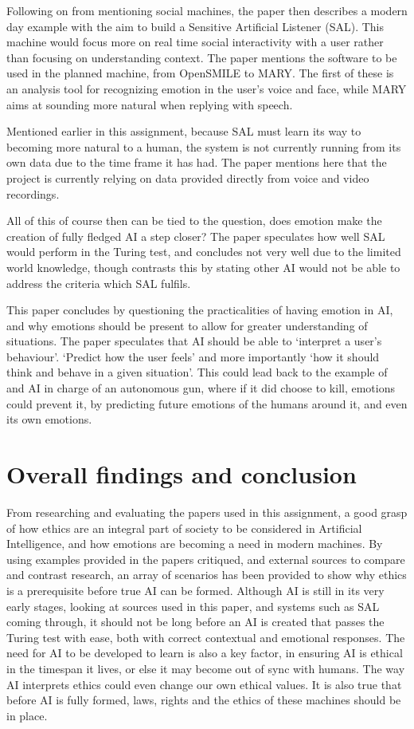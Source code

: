 \documentclass[article]{IEEEtran}
\begin{document}
Following on from mentioning social machines, the paper then describes a modern day example with the aim to build a Sensitive Artificial Listener (SAL). This machine would focus more on real time social interactivity with a user rather than focusing on understanding context. The paper mentions the software to be used in the planned machine, from OpenSMILE to MARY. The first of these is an analysis tool for recognizing emotion in the user’s voice and face, while MARY aims at sounding more natural when replying with speech. \par
Mentioned earlier in this assignment, because SAL must learn its way to becoming more natural to a human, the system is not currently running from its own data due to the time frame it has had. The paper mentions here that the project is currently relying on data provided directly from voice and video recordings. \par
All of this of course then can be tied to the question, does emotion make the creation of fully fledged AI a step closer? The paper speculates how well SAL would perform in the Turing test, and concludes not very well due to the limited world knowledge, though contrasts this by stating other AI would not be able to address the criteria which SAL fulfils.\par
This paper concludes by questioning the practicalities of having emotion in AI, and why emotions should be present to allow for greater understanding of situations. The paper speculates that AI should be able to ‘interpret a user’s behaviour’. ‘Predict how the user feels’ and more importantly ‘how it should think and behave in a given situation’. This could lead back to the example of and AI in charge of an autonomous gun, where if it did choose to kill, emotions could prevent it, by predicting future emotions of the humans around it, and even its own emotions. \par

\section{Overall findings and conclusion}
From researching and evaluating the papers used in this assignment, a good grasp of how ethics are an integral part of society to be considered in Artificial Intelligence, and how emotions are becoming a need in modern machines. By using examples provided in the papers critiqued, and external sources to compare and contrast research, an array of scenarios has been provided to show why ethics is a prerequisite before true AI can be formed.
 Although AI is still in its very early stages, looking at sources used in this paper, and systems such as SAL coming through, it should not be long before an AI is created that passes the Turing test with ease, both with correct contextual and emotional responses. The need for AI to be developed to learn is also a key factor, in ensuring AI is ethical in the timespan it lives, or else it may become out of sync with humans. The way AI interprets ethics could even change our own ethical values. It is also true that before AI is fully formed, laws, rights and the ethics of these machines should be in place. 
\end{document}

